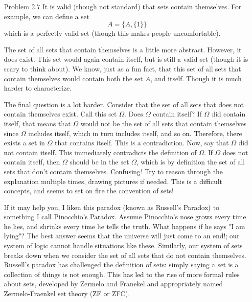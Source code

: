 \begin{sol}{Problem 2.7}
It is valid (though not standard) that sets contain themselves. For example, we can define a set 
\[
A = \{ A, \{ 1\}\}
\]
which is a perfectly valid set (though this makes people uncomfortable). 

The set of all sets that contain themselves is a little more abstract. However, it does exist. This set would again contain itself, but is still a valid set (though it is scary to think about). We know, just as a fun fact, that this set of all sets that contain themselves would contain both the set $A$, and itself. Though it is much harder to characterize. 

The final question is a lot harder. Consider that the set of all sets that does not contain themselves exist. Call this set $\Omega$. Does $\Omega$ contain itself? If $\Omega$ did contain itself, that means that $\Omega$ would not be the set of all sets that contain themselves since $\Omega$ includes itself, which in turn includes itself, and so on. Therefore, there exists a set in $\Omega$ that contains itself. This is a contradiction. Now, say that $\Omega$ did not contain itself. This immediately contradicts the definition of $\Omega$. If $\Omega$ does not contain itself, then $\Omega$ should be in the set $\Omega$, which is by definition the set of all sets that don't contain themselves. Confusing! Try to reason through the explanation multiple times, drawing pictures if needed. This is a difficult concepts, and seems to set on fire the convention of sets! 

If it may help you, I liken this paradox (known as Russell's Paradox) to something I call Pinocchio's Paradox. Assume Pinocchio's nose grows every time he lies, and shrinks every time he tells the truth. What happens if he says "I am lying"? The best answer seems that the universe will just come to an end!; our system of logic cannot handle situations like these. Similarly, our system of sets breaks down when we consider the set of all sets that do not contain themselves. Russell's paradox has challenged the definition of sets: simply saying a set is a collection of things is not enough. This has led to the rise of more formal rules about sets, developed by Zermelo and Franekel and appropriately named Zermelo-Fraenkel set theory (ZF or ZFC). 
\end{sol}